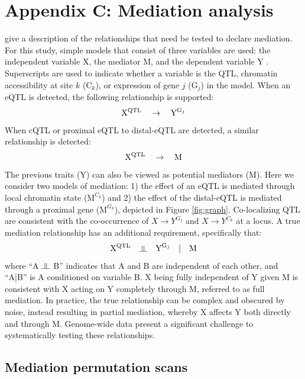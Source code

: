 \documentclass[9pt,twocolumn,twoside]{gsajnl}
\newcommand{\indep}{\rotatebox[origin=c]{90}{$\models$}}
\begin{document}
\section{Appendix C: Mediation analysis}

\cite{Baron1986} give a description of the relationships that need be tested to declare mediation. For this study, simple models that consist of three variables are used: the independent variable X, the mediator M, and the dependent variable Y \citep{MacKinnon2007}. Superscripts are used to indicate whether a variable is the QTL, chromatin accessibility at site $k$ ($\text{C}_{k}$), or expression of gene $j$ ($\text{G}_{j}$) in the model. When an eQTL is detected, the following relationship is supported:
\begin{equation}
\text{X}\textsuperscript{QTL} \quad \rightarrow \quad \text{Y}^{\text{G}_{j}}
\label{rel:eQTL}
\end{equation}
When cQTL or proximal eQTL to distal-eQTL are detected, a similar relationship is detected:
\begin{equation}
\text{X}\textsuperscript{QTL} \quad \rightarrow \quad \text{M}
\label{rel:cQTL}
\end{equation}
The previous traits (Y) can also be viewed as potential mediators (M). Here we consider two models of mediation: 1) the effect of an eQTL is mediated through local chromatin state ($\text{M}^{C_{k}}$) and 2) the effect of the distal-eQTL is mediated through a proximal gene ($\text{M}^{G_{k}}$), depicted in Figure \ref{fig:graph}. Co-localizing QTL are consistent with the co-occurrence of $X \rightarrow Y^{G_{j}}$ and $X \rightarrow Y^{C_{k}}$ at a locus. A true mediation relationship has an additional requirement, specifically that: 
\begin{equation}
\text{X}\textsuperscript{QTL} \quad \indep \quad \text{Y}^{\text{G}_{j}} \quad | \quad \text{M}
\label{rel:full_mediator}
\end{equation}
where ``A $\indep$ B'' indicates that A and B are independent of each other, and ``A|B'' is A conditioned on variable B. X being fully independent of Y given M is consistent with X acting on Y completely through M, referred to as full mediation. In practice, the true relationship can be complex and obscured by noise, instead resulting in partial mediation, whereby X affects Y both directly and through M. Genome-wide data present a significant challenge to systematically testing these relationships.

\subsection{Mediation permutation scans}
\end{document}
